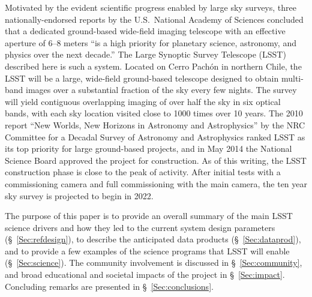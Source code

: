 Motivated by the evident scientific progress enabled by large sky surveys,
three nationally-endorsed reports by the U.S.\ National Academy of Sciences
\citep{NAP9839,NAP10079,NAP10432}
concluded that a dedicated ground-based wide-field imaging telescope with an effective aperture
of 6--8 meters ``is a high priority for planetary science, astronomy, and physics
over the next decade.'' The Large Synoptic Survey Telescope (LSST) described here is
such a system. Located on Cerro Pach\'on in northern Chile,
the LSST will be a large, wide-field ground-based telescope
designed to obtain multi-band images over a substantial fraction of the sky
every few nights. The survey will yield contiguous overlapping imaging of over
half the sky in six optical bands, with each sky location visited close to 1000 times over
10 years. The 2010 report ``New Worlds, New Horizons in Astronomy and Astrophysics''
by the NRC Committee for a Decadal Survey of Astronomy and
Astrophysics \citep{NAP12951}
ranked LSST as its top priority for large ground-based projects, and in May 2014 the National
Science Board approved the project for construction.
As of this writing, the LSST construction phase is close to the peak
of activity.
After initial tests with a commissioning camera and full commissioning
with the main camera, the
ten year sky survey is projected to begin in 2022.

The purpose of this paper is to provide an overall summary of the main LSST
science drivers and how they led to the current system design parameters
(\S~\ref{Sec:refdesign}), to describe the anticipated data products (\S~\ref{Sec:dataprod}),
and to provide a few examples of the science programs that LSST will enable
(\S~\ref{Sec:science}). The community involvement is discussed in \S~\ref{Sec:community},
and broad educational and societal impacts of the project in \S~\ref{Sec:impact}. Concluding
remarks are presented in \S~\ref{Sec:conclusions}.
